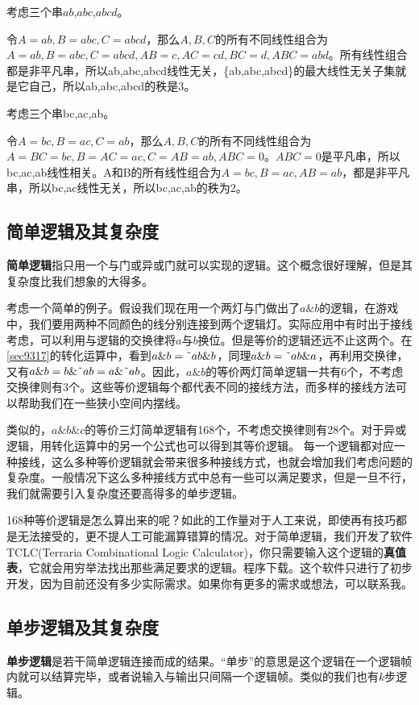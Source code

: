 \begin{example}{}{}
考虑三个串$ab$,$abc$,$abcd$。

令$A=ab,B=abc,C=abcd$，那么$A,B,C$的所有不同线性组合为$A=ab,B=abc,C=abcd,AB=c,AC=cd,BC=d,ABC=abd$。所有线性组合都是非平凡串，所以ab,abc,abcd线性无关，\{ab,abc,abcd\}的最大线性无关子集就是它自己，所以ab,abc,abcd的秩是3。
\end{example}

\begin{example}{}{}
考虑三个串bc,ac,ab。

令$A=bc,B=ac,C=ab$，那么$A,B,C$的所有不同线性组合为$A=BC=bc,B=AC=ac,C=AB=ab,ABC=0$。$ABC=0$是平凡串，所以bc,ac,ab线性相关。A和B的所有线性组合为$A=bc,B=ac,AB=ab$，都是非平凡串，所以bc,ac线性无关，所以bc,ac,ab的秩为2。
\end{example}

\subsection{简单逻辑及其复杂度}
\textbf{简单逻辑}指只用一个与门或异或门就可以实现的逻辑。这个概念很好理解，但是其复杂度比我们想象的大得多。

考虑一个简单的例子。假设我们现在用一个两灯与门做出了$a\&b$的逻辑，在游戏中，我们要用两种不同颜色的线分别连接到两个逻辑灯。实际应用中有时出于接线考虑，可以利用与逻辑的交换律将$a$与$b$换位。但是等价的逻辑还远不止这两个。在\autoref{sec9317}的转化运算中，看到$a\&b=\textrm{\~{}} ab\&b$，同理$a\&b=\textrm{\~{}} ab\&a$，再利用交换律，又有$a\&b=b\&\textrm{\~{}} ab=a\&\textrm{\~{}} ab$。因此，$a\&b$的等价两灯简单逻辑一共有6个，不考虑交换律则有3个。这些等价逻辑每个都代表不同的接线方法，而多样的接线方法可以帮助我们在一些狭小空间内摆线。

类似的，$a\&b\&c$的等价三灯简单逻辑有168个，不考虑交换律则有28个。对于异或逻辑，用转化运算中的另一个公式也可以得到其等价逻辑。
每一个逻辑都对应一种接线，这么多种等价逻辑就会带来很多种接线方式，也就会增加我们考虑问题的复杂度。一般情况下这么多种接线方式中总有一些可以满足要求，但是一旦不行，我们就需要引入复杂度还要高得多的单步逻辑。

168种等价逻辑是怎么算出来的呢？如此的工作量对于人工来说，即使再有技巧都是无法接受的，更不提人工可能漏算错算的情况。对于简单逻辑，我们开发了软件TCLC(Terraria Combinational Logic Calculator)，你只需要输入这个逻辑的\textbf{真值表}，它就会用穷举法找出那些满足要求的逻辑。程序下载。这个软件只进行了初步开发，因为目前还没有多少实际需求。如果你有更多的需求或想法，可以联系我。

\subsection{单步逻辑及其复杂度}
\textbf{单步逻辑}是若干简单逻辑连接而成的结果。“单步”的意思是这个逻辑在一个逻辑帧内就可以结算完毕，或者说输入与输出只间隔一个逻辑帧。类似的我们也有$k$步逻辑。

